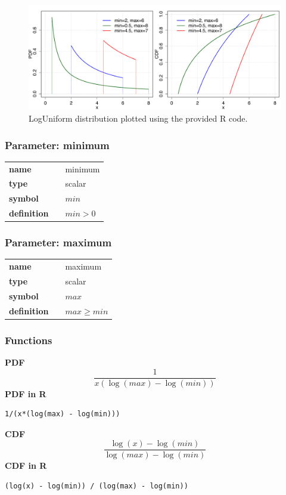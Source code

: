 \begin{figure}[ht!]
\centering
  \includegraphics[width=140mm]{pics/LogUniform.pdf}
 \caption{LogUniform distribution plotted using the provided R code.}
 \label{fig:LogUniform}
\end{figure}

\subsubsection*{Parameter: minimum}

\noindent\begin{tabular}{p{2cm}cl}
\textbf{name} & & minimum \\
\textbf{type} & & scalar \\
\textbf{symbol} & & $min$  \\
\textbf{definition} & & $min>0$
\end{tabular}
\subsubsection*{Parameter: maximum}

\noindent\begin{tabular}{p{2cm}cl}
\textbf{name} & & maximum \\
\textbf{type} & & scalar \\
\textbf{symbol} & & $max$  \\
\textbf{definition} & & $max \geq min$
\end{tabular}
\subsubsection*{Functions}

\smallskip \noindent \hspace{.2cm} \textbf{PDF} 
\begin{equation*}\frac{1}{x(\log(max) - \log(min))}\end{equation*}
\smallskip \noindent \hspace{.2cm} \textbf{PDF in R}  
\begin{verbatim}1/(x*(log(max) - log(min)))\end{verbatim}
\smallskip \noindent \hspace{.2cm} \textbf{CDF} 
\begin{equation*}\frac{\log(x) - \log(min)}{\log(max) - \log(min)}\end{equation*}
\smallskip \noindent \hspace{.2cm} \textbf{CDF in R} 
\begin{verbatim}(log(x) - log(min)) / (log(max) - log(min))\end{verbatim}
\smallskip
